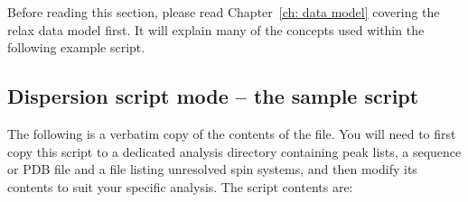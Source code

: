 Before reading this section, please read Chapter~\ref{ch: data model} covering the relax data model first.  It will explain many of the concepts used within the following example script.



\subsection{Dispersion script mode -- the sample script}

The following is a verbatim copy of the contents of the  file.
You will need to first copy this script to a dedicated analysis directory containing peak lists, a sequence or PDB file and a file listing unresolved spin systems, and then modify its contents to suit your specific analysis.
The script contents are:

